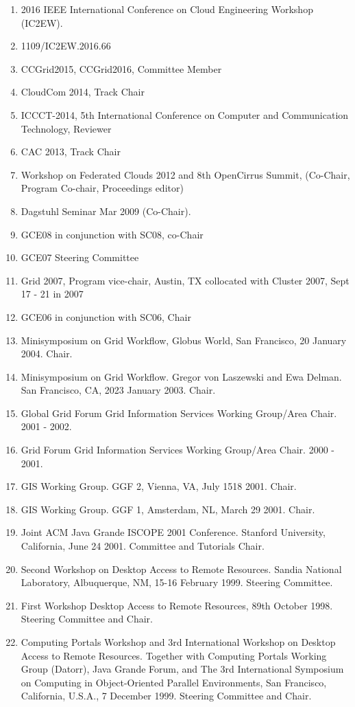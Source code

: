\documentclass{article}
\begin{document}
\begin{enumerate}
\item  2016 IEEE International Conference on Cloud Engineering Workshop (IC2EW).
\item 1109/IC2EW.2016.66
\item  CCGrid2015, CCGrid2016, Committee Member
\item  CloudCom 2014, Track Chair
\item  ICCCT-2014, 5th International Conference on Computer and Communication Technology, Reviewer
\item  CAC 2013, Track Chair
\item  Workshop on Federated Clouds  2012 and 8th OpenCirrus Summit, (Co-Chair, Program Co-chair, Proceedings editor)
\item  Dagstuhl Seminar Mar 2009 (Co-Chair).
\item  GCE08 in conjunction with SC08, co-Chair 
\item  GCE07 Steering Committee 
\item  Grid 2007, Program vice-chair, Austin, TX collocated with Cluster 2007, Sept 17 - 21 in 2007 
\item  GCE06 in conjunction with SC06, Chair 
\item  Minisymposium on Grid Workflow, Globus World, San Francisco, 20 January 2004. Chair. 
\item  Minisymposium on Grid Workflow. Gregor von Laszewski and Ewa Delman. San Francisco, CA, 2023 January 2003. Chair. 
\item  Global Grid Forum Grid Information Services Working Group/Area Chair. 2001 - 2002. 
\item  Grid Forum Grid Information Services Working Group/Area Chair. 2000 - 2001. 
\item  GIS Working Group. GGF 2, Vienna, VA, July 1518 2001. Chair. 
\item  GIS Working Group. GGF 1, Amsterdam, NL, March 29 2001. Chair. 
\item  Joint ACM Java Grande ISCOPE 2001 Conference. Stanford University, California, June 24 2001. Committee and Tutorials Chair. %
\item  Second Workshop on Desktop Access to Remote Resources. Sandia National Laboratory, Albuquerque, NM, 15-16 February 1999. Steering Committee. 
\item  First Workshop Desktop Access to Remote Resources, 89th October 1998. Steering Committee and Chair. 
\item  Computing Portals Workshop and 3rd International Workshop on Desktop Access to Remote Resources. Together with Computing Portals Working Group (Datorr), Java Grande Forum, and The 3rd International Symposium on Computing in Object-Oriented Parallel Environments, San Francisco, California, U.S.A.,  7 December 1999. Steering Committee and Chair. %

\end{enumerate}
\end{document}
